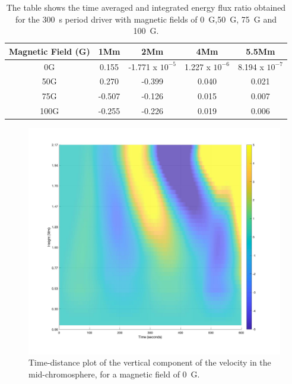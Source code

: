 \documentclass[physics,article,submit,pdftex,moreauthors]{Definitions/mdpi}
\begin{document}
\begin{table}\label{energyflux}
\centering
\begin{tabular}{c c c c c}
\hline
Magnetic Field (G)   &  1Mm  &  2Mm &  4Mm & 5.5Mm \\
\hline
0G & 0.155  &    -1.771 x $10^{-5}$      &   1.227 x $10^{-6}$     &   8.194 x $10^{-7}$      \\
\hline
50G & 0.270  &   -0.399       &   0.040      &  0.021     \\
\hline
75G & -0.507  &    -0.126      &   0.015     &   0.007      \\
\hline
100G & -0.255  &   -0.226      &   0.019      &   0.006    \\
\hline

\end{tabular} 
\caption{The table shows the time averaged and integrated energy flux ratio obtained  for the 300~s period driver with magnetic fields of 0~G,50~G, 75~G and 100~G.}
\label{energyfluxratio}
\end{table}





\begin{figure}
\centering
\label{td_vert_dif_bv0G_100G_300}
\includegraphics[scale=0.2]{td_vert_bv0G_300.jpg}
\caption{Time-distance plot of the vertical component of the velocity in the mid-chromosphere, for a magnetic field of 0~G.}
\end{figure}
\end{document}
